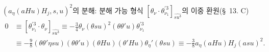 
$(a_\eta(aHu)H_j,s,u)^2$의 분해: 분해 가능 형식 $[\theta_\nu\cdot\theta_{\nu_1}^{\prime 3}]_{\widehat{su^3}}$의 이중 환원(\S\ 13. C)
\begin{align*}
0&\equiv[\theta_{\nu_1}^{\prime 3}\cdot\theta_\nu]_{\widehat{su^3}}
\equiv-\frac34\theta_\nu(\theta su)^2(\theta\theta'u)\theta_{\nu_1}^{\prime 3}\\
&\equiv-\frac98(\theta\theta'\eta su)(\theta\theta'u)(\theta Hu)(\theta'Hu)\theta_\eta'(\theta su)
\equiv-\frac38a_\eta(aHu)H_j(asu)^2.
\end{align*}
